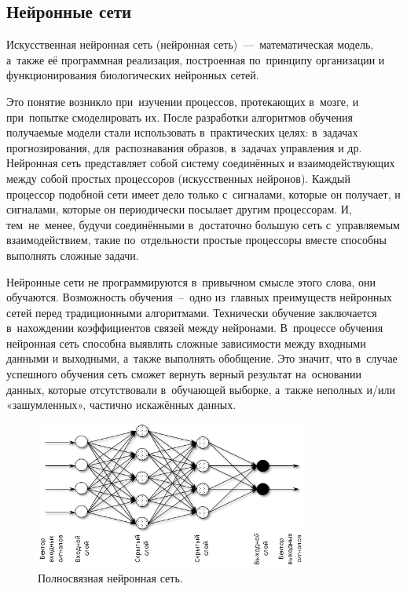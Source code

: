 \subsection{Нейронные сети}\label{subsec:neural_network}

\begin{definition}
  Искусственная нейронная сеть (нейронная сеть)~---~математическая модель, а~также её программная реализация, построенная по~принципу организации и функционирования биологических нейронных сетей.
\end{definition}
Это понятие возникло при~изучении процессов, протекающих в~мозге, и при~попытке смоделировать их. После разработки алгоритмов обучения получаемые модели стали использовать в~практических целях: в~задачах прогнозирования, для~распознавания образов, в~задачах управления и др.
Нейронная сеть представляет собой систему соединённых и взаимодействующих между собой простых процессоров (искусственных нейронов).
Каждый процессор подобной сети имеет дело только с~сигналами, которые он получает, и сигналами, которые он периодически посылает другим процессорам. И, тем~не~менее, будучи соединёнными в~достаточно большую сеть с~управляемым взаимодействием, такие по~отдельности простые процессоры вместе способны выполнять сложные задачи.

Нейронные сети не программируются в~привычном смысле этого слова, они обучаются. Возможность обучения~--~одно из~главных преимуществ нейронных сетей перед традиционными алгоритмами. Технически обучение заключается в~нахождении коэффициентов связей между нейронами. В~процессе обучения нейронная сеть способна выявлять сложные зависимости между входными данными и выходными, а~также выполнять обобщение. Это значит, что в~случае успешного обучения сеть сможет вернуть верный результат на~основании данных, которые отсутствовали в~обучающей выборке, а~также неполных и/или «зашумленных», частично искажённых данных.

\begin{figure}[h]
    \centering
    \includegraphics[width=0.8\textwidth]{nn_vizualisation}
    \caption{Полносвязная нейронная сеть.}
    \label{fig:nn}
\end{figure}

